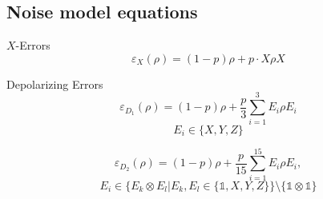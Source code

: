 \documentclass{beamer}
\begin{document}
\subsection*{Noise model equations}
\begin{frame}
\begin{block}{$X$-Errors}
    \begin{equation}
        \varepsilon_{X}(\rho) = (1-p) \rho + p \cdot X \rho X
    \end{equation}
\end{block}

\begin{block}{Depolarizing Errors}
    \begin{equation}
        \varepsilon_{D_1}(\rho) = (1-p) \rho + \frac{p}{3} \sum^3_{i=1} E_i \rho E_i
    \end{equation}
    \begin{equation*}
        E_i \in \{ X, Y, Z \}
    \end{equation*}

        \begin{equation}
            \varepsilon_{D_2}(\rho) = (1-p) \rho + \frac{p}{15} \sum_{i=1}^{15} E_i \rho E_i,
        \end{equation}
        \begin{equation*}
            E_i \in \{E_k \otimes E_l | E_k,E_l \in \{\mathbb{1},X,Y,Z\} \} \setminus \{\mathbb{1}\otimes\mathbb{1} \}
        \end{equation*}
    \end{block}
\end{frame}
\end{document}
